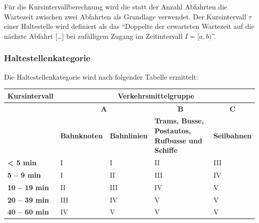 Für die Kursintervallberechnung wird die statt der Anzahl Abfahrten die Wartezeit zwischen zwei Abfahrten als Grundlage verwendet.
Der Kursintervall $\tau$ einer Haltestelle wird definiert als das "`Doppelte der erwarteten Wartezeit auf die nächste Abfahrt [\ldots] bei zufälligem Zugang im Zeitintervall $I = [a,b)$"'.~\cite{visum_manual_formula}

\subsubsection{Haltestellenkategorie}
\label{Zusammenhang zur Berechnungsmethodik ARE:Haltestellenkategorie}

\begin{itquote}
Die Haltestellenkategorie wird nach folgender Tabelle ermittelt:
\begin{table}[ht]
    \centering
    \begin{itquote}
    \begin{tabular}[c]{l | p{2.3cm} p{2.3cm} | p{2.2cm} | p{2.2cm}}
        \toprule
        \textbf{Kursintervall}
                                & \multicolumn{4}{c}{\textbf{Verkehrsmittelgruppe}}\\
        \midrule
        \textbf{}
                                & \multicolumn{2}{c|}{\textbf{A}}
                                & \multicolumn{1}{c}{\textbf{B}}
                                & \multicolumn{1}{c}{\textbf{C}}\\
        \textbf{}
                                & \textbf{Bahnknoten}
                                & \textbf{Bahnlinien}
                                & \textbf{Trams, Busse, Postautos, Rufbusse und Schiffe}
                                & \textbf{Seilbahnen}\\
        \textbf{< 5 min}
                                & I
                                & I
                                & II
                                & III\\
        \textbf{5 -- 9 min}
                                & I
                                & II
                                & III
                                & IV\\
        \textbf{10 -- 19 min}
                                & II
                                & III
                                & IV
                                & V\\
        \textbf{20 -- 39 min}
                                & III
                                & IV
                                & V
                                & V\\
        \textbf{40 -- 60 min}
                                & IV
                                & V
                                & V
                                & V\\
        \bottomrule
    \end{tabular}
    \end{itquote}
\end{table}
\end{itquote}


